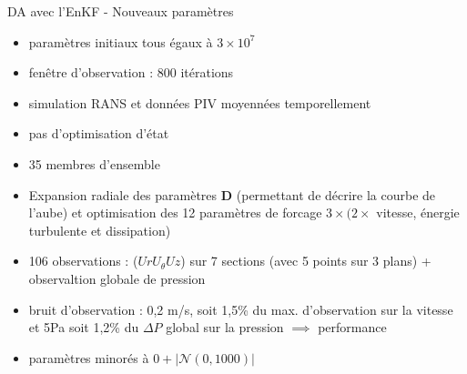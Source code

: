 \documentclass[10pt, aspectratio=169, dvipsnames]{beamer}
\begin{document}

    


\begin{frame}{DA avec l'EnKF - Nouveaux paramètres}

    \begin{itemize}
        \item paramètres initiaux tous égaux à $3 \times 10^7$
        \item fenêtre d'observation : 800 itérations
        \item simulation RANS et données PIV moyennées temporellement
        \item pas d'optimisation d'état
        \item 35 membres d'ensemble
    \end{itemize}


    \begin{itemize}
        \item Expansion radiale des paramètres $\boldsymbol{D}$ (permettant de décrire la courbe de l'aube) et optimisation des 12 paramètres de forcage $3\times (2\times$ vitesse, énergie turbulente et dissipation)
        \item 106 observations : ($Ur U_{\theta} Uz$) sur 7 sections (avec 5 points sur 3 plans) + observaltion globale de pression
        \item bruit d'observation : 0,2 m/s, soit 1,5\% du max. d'observation sur la vitesse et 5Pa soit 1,2\% du $\Delta P$ global sur la pression $\implies$ performance
        \item paramètres minorés à $0 + \left| \mathcal{N}(0, 1000) \right|$
    \end{itemize}

\end{frame}
\end{document}
